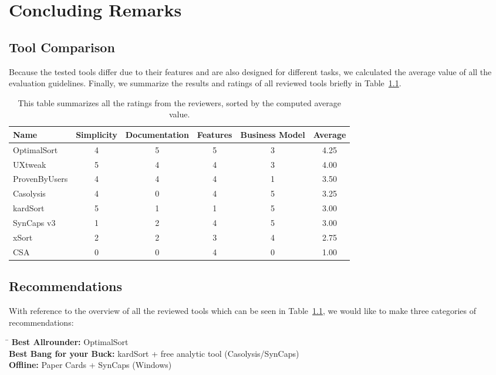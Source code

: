 \chapter{Concluding Remarks}

\label{chap:Concl}

\section{Tool Comparison}

Because the tested tools differ due to their features and are also designed for different tasks, 
we calculated the average value of all the evaluation guidelines. 
Finally, we summarize the results and ratings of all reviewed tools briefly in Table~\ref{tab:tool-comparison}.

\begin{table}[h]
\centering
\begin{tabularx}
{\linewidth}{|X|c|c|c|c|c|}
\hline \textbf{Name} & \textbf{Simplicity} & \textbf{Documentation} & \textbf{Features} & \textbf{Business Model} & \textbf{Average}\\ 
\hline OptimalSort & 4 & 5 & 5 & 3 & 4.25 \\ 
\hline UXtweak & 5 & 4 & 4 & 3 & 4.00 \\ 
\hline ProvenByUsers & 4 & 4 & 4 & 1 & 3.50 \\ 
\hline Casolysis & 4 & 0 & 4 & 5 & 3.25 \\ 
\hline kardSort & 5 & 1 & 1 & 5 & 3.00 \\ 
\hline SynCaps v3 & 1 & 2 & 4 & 5 & 3.00 \\ 
\hline xSort & 2 & 2 & 3 & 4 & 2.75 \\ 
\hline CSA & 0 & 0 & 4 & 0 & 1.00 \\ 
\hline
\end{tabularx} 
\caption[Tool Comparison] 
{ 
This table summarizes all the ratings from the reviewers, sorted by the computed average value.
}
\label{tab:tool-comparison}
\end{table}

\section{Recommendations}
With reference to the overview of all the reviewed tools which can be seen in Table~\ref{tab:tool-comparison}, we would like to make three categories of recommendations:


\begin{tabbing}
\hspace*{5cm}\= \kill
\textbf{Best Allrounder:} \> OptimalSort \\
\textbf{Best Bang for your Buck:} \> kardSort + free analytic tool (Casolysis/SynCaps) \\
\textbf{Offline:} \> Paper Cards + SynCaps (Windows)
\end{tabbing}
